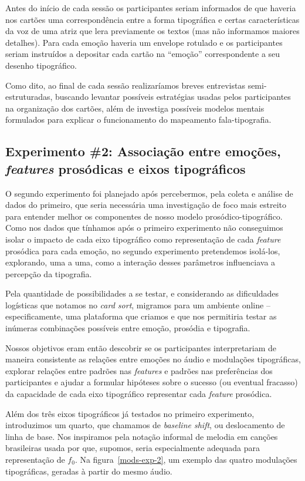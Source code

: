 \documentclass[a4paper]{tufte-handout}
\newcommand{\textls}[2][5]{%
    \begingroup\addfontfeatures{LetterSpace=#1}#2\endgroup
  }
\renewcommand{\smallcapsspacing}[1]{\textls[10]{#1}}
\renewcommand{\textsc}[1]{\smallcapsspacing{\textsmallcaps{#1}}}
\newcommand{\num}[1]{\textsc{(\oldstylenums{#1})}}
\begin{document}
Antes do início de cada sessão os participantes seriam informados de que haveria nos cartões uma correspondência entre a forma tipográfica e certas características da voz de uma atriz que lera previamente os textos (mas não informamos maiores detalhes). Para cada emoção haveria um envelope rotulado e os participantes seriam instruídos a depositar cada cartão na ``emoção'' correspondente a seu desenho tipográfico. 

Como dito, ao final de cada sessão realizaríamos breves entrevistas semi-estruturadas, buscando levantar possíveis estratégias usadas pelos participantes na organização dos cartões, além de investiga possíveis modelos mentais formulados para explicar o funcionamento do mapeamento fala-tipografia.

\subsection{Experimento \#2: Associação entre emoções, \textit{features} prosódicas e eixos tipográficos}\label{sec:met_exp_2}

O segundo experimento foi planejado após percebermos, pela coleta e análise de dados do primeiro, que seria necessária uma investigação de foco mais estreito para entender melhor os componentes de nosso modelo prosódico-tipográfico. Como nos dados que tínhamos após o primeiro experimento não conseguimos isolar o impacto de cada eixo tipográfico como representação de cada \textit{feature} prosódica para cada emoção, no segundo experimento pretendemos isolá-los, explorando, uma a uma, como a interação desses parâmetros influenciava a percepção da tipografia. 

Pela quantidade de possibilidades a se testar, e considerando as dificuldades logísticas que notamos no \textit{card sort}, migramos para um ambiente online -- especificamente, uma plataforma que criamos e que nos permitiria testar as inúmeras combinações possíveis entre emoção, prosódia e tipografia. 

Nossos objetivos eram então \num{1} descobrir se os participantes interpretariam de maneira consistente as relações entre emoções no áudio e modulações tipográficas, \num{2} explorar relações entre padrões nas \textit{features} e padrões nas preferências dos participantes e \num{3} ajudar a formular hipóteses sobre o sucesso (ou eventual fracasso) da capacidade de cada eixo tipográfico representar cada \textit{feature} prosódica.

Além dos três eixos tipográficos já testados no primeiro experimento, introduzimos um quarto, que chamamos de \textit{baseline shift}, ou deslocamento de linha de base. Nos inspiramos pela notação informal de melodia em canções brasileiras usada por \citet{tatit} que, supomos, seria especialmente adequada para representação de $f_0$. Na figura~\ref{mods-exp-2}, um exemplo das quatro modulações tipográficas, geradas à partir do mesmo áudio.
\end{document}
